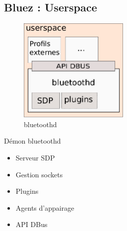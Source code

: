 \subsection{Bluez : Userspace}
\begin{frame}
\begin{minipage}[t]{0.60\linewidth}
	\begin{figure}
		\includegraphics[height=5cm]{bluetoothd.png}
		\caption{bluetoothd}
	\end{figure}
\end{minipage}
\begin{minipage}[t]{0.30\linewidth}
	\begin{block}{Démon bluetoothd}
		\begin{itemize}
			\item Serveur SDP
			\item Gestion sockets
			\item Plugins
			\item Agents d'appairage
			\item API DBus
		\end{itemize}
	\end{block}
\end{minipage}
\end{frame}

